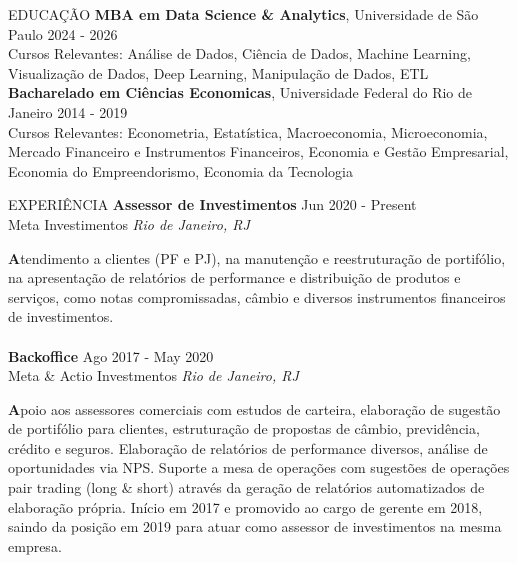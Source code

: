 \documentclass{resume} %
\begin{document}






\begin{rSection}{EDUCAÇÃO}
{\bf MBA em Data Science \& Analytics}, Universidade de São Paulo \hfill {2024 - 2026}\\
\small{Cursos Relevantes: Análise de Dados, Ciência de Dados, Machine Learning, Visualização de Dados, Deep Learning, Manipulação de Dados, ETL} \\
{\bf Bacharelado em Ciências Economicas}, Universidade Federal do Rio de Janeiro \hfill {2014 - 2019} \\
\small{Cursos Relevantes: Econometria, Estatística, Macroeconomia, Microeconomia, Mercado Financeiro e Instrumentos Financeiros, Economia e Gestão Empresarial, Economia do Empreendorismo, Economia da Tecnologia} 
\end{rSection}

\begin{rSection}{EXPERIÊNCIA}
\textbf{Assessor de Investimentos} \hfill Jun 2020 - Present\\
Meta Investimentos \hfill \textit{Rio de Janeiro, RJ}
\vspace{-0.50em} \item \small{\textbf Atendimento a clientes (PF e PJ), na manutenção e reestruturação de portifólio, na apresentação de relatórios de performance e distribuição de produtos e serviços, como notas compromissadas, câmbio e diversos instrumentos financeiros de investimentos}.\\
\vspace{-0.50em}\\
\textbf{Backoffice} \hfill Ago 2017 - May 2020\\
Meta \& Actio Investmentos \hfill \textit{Rio de Janeiro, RJ}
\vspace{-0.50em} \item \small{\textbf Apoio aos assessores comerciais com estudos de carteira, elaboração de sugestão de portifólio para clientes, estruturação de propostas de câmbio, previdência, crédito e seguros. Elaboração de relatórios de performance diversos, análise de oportunidades via NPS. Suporte a mesa de operações com sugestões de operações pair trading (long \& short) através da geração de relatórios automatizados de elaboração própria. Início em 2017 e promovido ao cargo de gerente em 2018, saindo da posição em 2019 para atuar como assessor de investimentos na mesma empresa.}
\end{rSection} 
\end{document}
